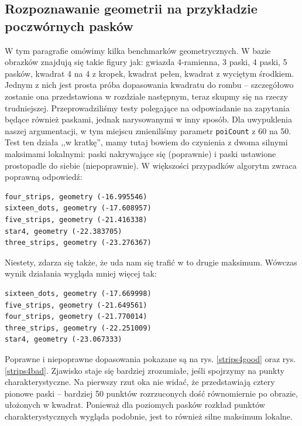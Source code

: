 \documentclass[a4paper,12pt,leqno]{article}
\begin{document}
\subsection{Rozpoznawanie geometrii na przykładzie poczwórnych pasków}

W tym paragrafie omówimy kilka benchmarków geometrycznych. W bazie obrazków znajdują się takie figury jak: gwiazda 4-ramienna, 3 paski, 4 paski,
5 pasków, kwadrat 4 na 4 z kropek, kwadrat pełen, kwadrat z wyciętym środkiem. Jednym z nich jest prosta próba dopasowania kwadratu do
rombu -- szczegółowo zostanie ona przedstawiona w rozdziale następnym, teraz skupmy się na rzeczy trudniejszej. Przeprowadziliśmy testy polegające
na odpowiadanie na zapytania będące również paskami, jednak narysowanymi w inny sposób. Dla uwypuklenia naszej argumentacji, w tym miejscu zmieniliśmy
parametr \texttt{poiCount} z 60 na 50. Test ten działa ,,w kratkę'', mamy tutaj bowiem do czynienia z dwoma silnymi maksimami lokalnymi: paski
nakrywające się (poprawnie) i paski ustawione prostopadle do siebie (niepoprawnie). W większości przypadków algorytm zwraca poprawną odpowiedź:
\begin{verbatim}
four_strips, geometry (-16.995546)
sixteen_dots, geometry (-17.608957)
five_strips, geometry (-21.416338)
star4, geometry (-22.383705)
three_strips, geometry (-23.276367)
\end{verbatim}
Niestety, zdarza się także, że uda nam się trafić w to drugie maksimum. Wówczas wynik działania wygląda mniej więcej tak:
\begin{verbatim}
sixteen_dots, geometry (-17.669998)
five_strips, geometry (-21.649561)
four_strips, geometry (-21.770014)
three_strips, geometry (-22.251009)
star4, geometry (-23.067333)
\end{verbatim}
Poprawne i niepoprawne dopasowania pokazane są na rys. \ref{strips4good} oraz rys. \ref{strips4bad}. Zjawisko staje się bardziej zrozumiałe, jeśli
spojrzymy na punkty charakterystyczne. Na pierwszy rzut oka nie widać, że przedstawiają cztery pionowe paski -- bardziej 50 punktów rozrzuconych dość
równomiernie po obrazie, ułożonych w kwadrat. Ponieważ dla poziomych pasków rozkład punktów charakterystycznych wygląda podobnie, jest to również
silne maksimum lokalne.
\end{document}
